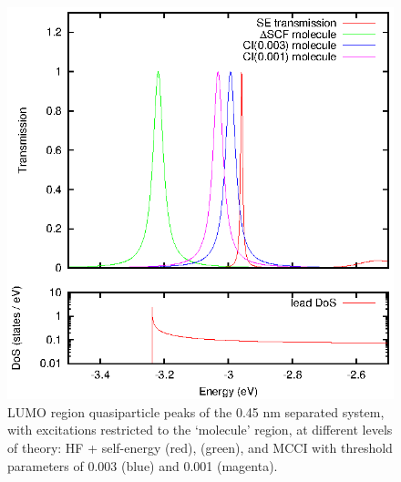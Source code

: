 \begin{figure}
	\begin{center}
		\includegraphics[width=0.9\linewidth]{figures/figure5a_5b}
	\end{center}
	\caption{LUMO region quasiparticle peaks of the 0.45 nm separated
	         system, with excitations restricted to the `molecule' region,
		 at different levels of theory: HF + self-energy (red),
		 \dscf (green), and MCCI with threshold parameters of
		 0.003 (blue) and 0.001 (magenta).}
	\label{fig:all45Alumo}
\end{figure}

